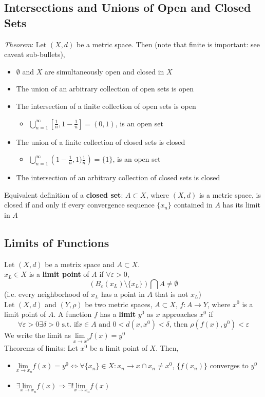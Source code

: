 \documentclass{article}
\newcommand{\intersect}{\bigcap}
\newcommand{\union}{\bigcup}
\newcommand{\xlmt}{\underset{x\rightarrow x_n}{\text{lim }}}
\begin{document}
\subsection{Intersections and Unions of Open and Closed Sets}
\textit{Theorem}: Let $(X,d)$ be a metric space. Then (note that finite is important: see caveat sub-bullets),
\begin{itemize}
	\item $\emptyset$ and $X$ are simultaneously open and closed in $X$ 
	\item The union of an arbitrary collection of open sets is open
	\item The intersection of a finite collection of open sets is open
		\begin{itemize}
			\item $\union_{n=1}^\infty \left[\frac{1}{n},1-\frac{1}{n}\right]=(0,1)$, is an open set
		\end{itemize}
	\item The union of a finite collection of closed sets is closed
		\begin{itemize}
			\item $\bigcup_{n=1}^\infty \left(1-\frac{1}{n},1)\frac{1}{n}\right)=\{1\}$, is an open set
		\end{itemize}
	\item The intersection of an arbitrary collection of closed sets is closed 
\end{itemize}
Equivalent definition of a \textbf{closed set}: $A\subset X$, where $(X,d)$ is a metric space, is closed if and only if every convergence sequence $\{x_n\}$ contained in $A$ has its limit in $A$


\subsection{Limits of Functions}
Let $(X,d)$ be a metrix space and $A\subset X$.
\smallskip \\
$x_L\in X$ is a \textbf{limit point} of $A$ if $\forall\varepsilon>0$, 
\[
	(B_\varepsilon(x_L)\setminus\{x_L\})\intersect A\neq\emptyset
\]
(i.e. every neighborhood of $x_L$ has a point in $A$ that is not $x_L$)
\medskip \\
Let $(X,d)$ and $(Y,\rho)$ be two metric spaces, $A\subset X$, $f:A\rightarrow Y$, where $x^0$ is a limit point of $A$. A function $f$ has a \textbf{limit} $y^0$ as $x$ approaches $x^0$ if 
\[
	\forall\varepsilon>0\exists\delta>0\text{ s.t. if}x\in A\text{ and }0<d(x,x^0)<\delta\text{, then }\rho(f(x),y^0)<\varepsilon
\]
We write the limit as $\underset{x\rightarrow x^0}{\text{lim }}f(x)=y^0$
\bigskip \\
Theorems of limits: Let $x^0$ be a limit point of $X$. Then,
\begin{itemize}
	\item $\xlmt f(x)=y^0\iff\forall\{x_n\}\in X:x_n\rightarrow x\cap x_n\neq x^0$, $\{f(x_n)\}$ converges to $y^0$ 
	\item $\exists\xlmt f(x)\Rightarrow\exists!\xlmt f(x)$
\end{itemize}
\end{document}
